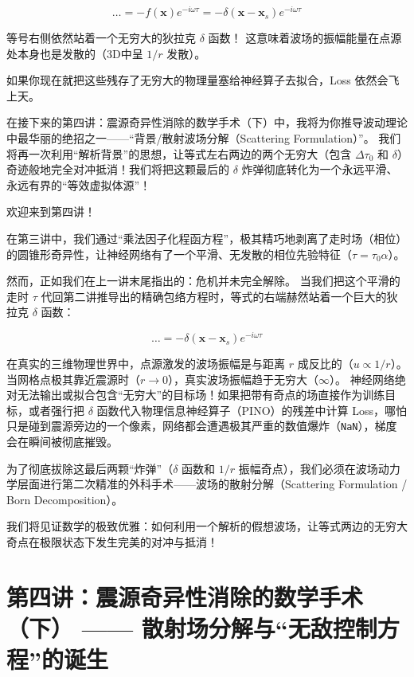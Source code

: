 \documentclass[12pt]{article}
\begin{document}
{\begin{equation}
\dots = -f(\mathbf{x})e^{-i\omega \tau} = -\delta(\mathbf{x} - \mathbf{x}_s)e^{-i\omega \tau}
\label{eq:3-delta-source}
\end{equation}

等号右侧依然站着一个无穷大的狄拉克 $\delta$ 函数！
这意味着波场的振幅能量在点源处本身也是发散的（3D中呈 $1/r$ 发散）。

如果你现在就把这些残存了无穷大的物理量塞给神经算子去拟合，Loss 依然会飞上天。

在接下来的第四讲：震源奇异性消除的数学手术（下）中，我将为你推导波动理论中最华丽的绝招之一——“背景/散射波场分解（Scattering Formulation）”。
我们将再一次利用“解析背景”的思想，让等式左右两边的两个无穷大（包含 $\Delta \tau_0$ 和 $\delta$）奇迹般地完全对冲抵消！我们将把这颗最后的 $\delta$ 炸弹彻底转化为一个永远平滑、永远有界的“等效虚拟体源”！




欢迎来到第四讲！

在第三讲中，我们通过“乘法因子化程函方程”，极其精巧地剥离了走时场（相位）的圆锥形奇异性，让神经网络有了一个平滑、无发散的相位先验特征（$\tau = \tau_0 \alpha$）。

然而，正如我们在上一讲末尾指出的：危机并未完全解除。
当我们把这个平滑的走时 $\tau$ 代回第二讲推导出的精确包络方程时，等式的右端赫然站着一个巨大的狄拉克 $\delta$ 函数：

\begin{equation}
\dots = -\delta(\mathbf{x} - \mathbf{x}_s) e^{-i \omega \tau}
\label{eq:4-delta-warning}
\end{equation}

在真实的三维物理世界中，点源激发的波场振幅是与距离 $r$ 成反比的（$u \propto 1/r$）。当网格点极其靠近震源时（$r \to 0$），真实波场振幅趋于无穷大（$\infty$）。
神经网络绝对无法输出或拟合包含“无穷大”的目标场！如果把带有奇点的场直接作为训练目标，或者强行把 $\delta$ 函数代入物理信息神经算子（PINO）的残差中计算 Loss，哪怕只是碰到震源旁边的一个像素，网络都会遭遇极其严重的数值爆炸（\texttt{NaN}），梯度会在瞬间被彻底摧毁。

为了彻底拔除这最后两颗“炸弹”（$\delta$ 函数和 $1/r$ 振幅奇点），我们必须在波场动力学层面进行第二次精准的外科手术——波场的散射分解（Scattering Formulation / Born Decomposition）。

我们将见证数学的极致优雅：如何利用一个解析的假想波场，让等式两边的无穷大奇点在极限状态下发生完美的对冲与抵消！

\section{第四讲：震源奇异性消除的数学手术（下） —— 散射场分解与“无敌控制方程”的诞生}

}
\end{document}
